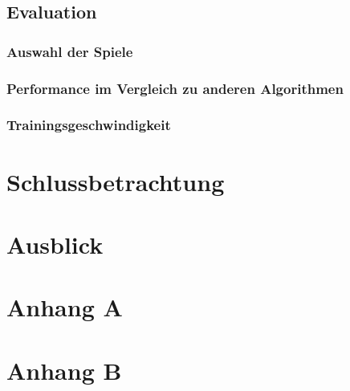 \documentclass[a4paper,titlepage]{article}
\numberwithin{equation}{section} %
\begin{document}
{%

\subsection{Evaluation}

\subsubsection{Auswahl der Spiele}

\subsubsection{Performance im Vergleich zu anderen Algorithmen}

\subsubsection{Trainingsgeschwindigkeit}

\newpage



\section{Schlussbetrachtung}
\newpage


\section{Ausblick}
\newpage



\begingroup
{}
\renewcommand*\refname{Literaturverzeichnis}
\printbibliography

\endgroup

\newpage
\section*{Anhang A}
\setcounter{page}{1}



\newpage


\section*{Anhang B}

\newpage

\end{document}
